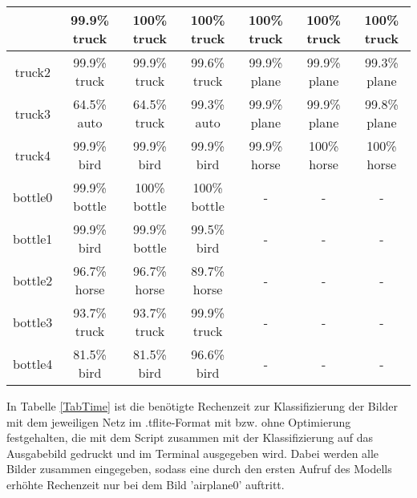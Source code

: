 \begin{longtable}{| c | c | c | c | c | c | c |}
& 99.9\% truck\cellcolor{green}		
& 100\% truck \cellcolor{green}	
& 100\% truck\cellcolor{green} 	
&  100\% truck\cellcolor{green}	
 & 100\% truck\cellcolor{green} 	
 & 100\% truck\cellcolor{green}\\
 \hline
truck2 \cellcolor{light-gray}	
& 99.9\% truck\cellcolor{green}		
& 99.9\% truck\cellcolor{green} 	
& 99.6\% truck\cellcolor{green} 	
&  99.9\% plane
& 99.9\% plane 	
& 99.3\% plane\\
 \hline
truck3 \cellcolor{light-gray}	
& 64.5\% auto		
& 64.5\% truck\cellcolor{green} 	
& 99.3\% auto 	
&  99.9\% plane
& 99.9\% plane 	
& 99.8\% plane\\
 \hline
truck4 \cellcolor{light-gray}	
& 99.9\% bird		
& 99.9\% bird 	
& 99.9\% bird 	
&  99.9\% horse	 
& 100\% horse 	
& 100\% horse\\
 \hline
bottle0\cellcolor{light-gray} 	
& 99.9\% bottle\cellcolor{green}		
& 100\% bottle\cellcolor{green} 	
& 100\% bottle\cellcolor{green} 	&  -	 & - 	& -\\
 \hline
bottle1\cellcolor{light-gray} 	
& 99.9\% bird		
& 99.9\% bottle\cellcolor{green} 	
& 99.5\% bird 	&  -	 & - 	& -\\
 \hline
bottle2\cellcolor{light-gray} 	
& 96.7\% horse		
& 96.7\% horse 	
& 89.7\% horse 	&  -	 & - 	& -\\
 \hline
bottle3\cellcolor{light-gray} 	
& 93.7\% truck		
& 93.7\% truck 	
& 99.9\% truck 	&  -	 & - 	& -\\
 \hline
bottle4\cellcolor{light-gray} 	
& 81.5\% bird		
& 81.5\% bird 	
& 96.6\% bird 	&  -	 & - 	& -\\
 \hline
\end{longtable}

In Tabelle \ref{TabTime} ist die benötigte Rechenzeit zur Klassifizierung der Bilder mit dem jeweiligen Netz im .tflite-Format mit bzw. ohne
Optimierung festgehalten, die mit dem Script  zusammen mit der Klassifizierung auf das Ausgabebild gedruckt
und im Terminal ausgegeben wird. Dabei werden alle Bilder zusammen eingegeben, sodass eine durch den ersten Aufruf des Modells 
erhöhte Rechenzeit nur bei dem Bild 'airplane0' auftritt.

